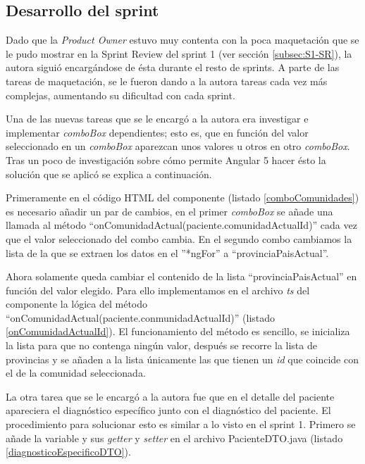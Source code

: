 \subsection{Desarrollo del sprint}
\label{subsec:S2-desarrollo}

Dado que la \emph{Product Owner} estuvo muy contenta con la poca maquetación que se le pudo mostrar en la Sprint Review del sprint 1 (ver sección \ref{subsec:S1-SR}), la autora siguió encargándose de ésta durante el resto de sprints. A parte de las tareas de maquetación, se le fueron dando a la autora tareas cada vez más complejas, aumentando su dificultad con cada sprint. 

Una de las nuevas tareas que se le encargó a la autora era investigar e implementar \emph{comboBox} dependientes; esto es, que en función del valor seleccionado en un \emph{comboBox} aparezcan unos valores u otros en otro \emph{comboBox}. Tras un poco de investigación sobre cómo permite Angular 5 hacer ésto la solución que se aplicó se explica a continuación. 

Primeramente en el código HTML del componente (listado \ref{comboComunidades}) es necesario añadir un par de cambios, en el primer \emph{comboBox} se añade una llamada al método ``onComunidadActual(paciente.comunidadActualId)'' cada vez que el valor seleccionado del combo cambia. En el segundo combo cambiamos la lista de la que se extraen los datos en el ''*ngFor'' a ``provinciaPaisActual''. 
\clearpage


Ahora solamente queda cambiar el contenido de la lista ``provinciaPaisActual'' en función del valor elegido. Para ello implementamos en el archivo \emph{ts} del componente la lógica del método ``onComunidadActual(paciente.conmunidadActualId)'' (listado \ref{onComunidadActualId}). El funcionamiento del método es sencillo, se inicializa la lista para que no contenga ningún valor, después se recorre la lista de provincias y se añaden a la lista únicamente las que tienen un \emph{id} que coincide con el de la comunidad seleccionada.



La otra tarea que se le encargó a la autora fue que en el detalle del paciente apareciera el diagnóstico específico junto con el diagnóstico del paciente. El procedimiento para solucionar esto es similar a lo visto en el sprint 1. Primero se añade la variable y sus \emph{getter} y \emph{setter} en el archivo PacienteDTO.java (listado \ref{diagnosticoEspecificoDTO}).

